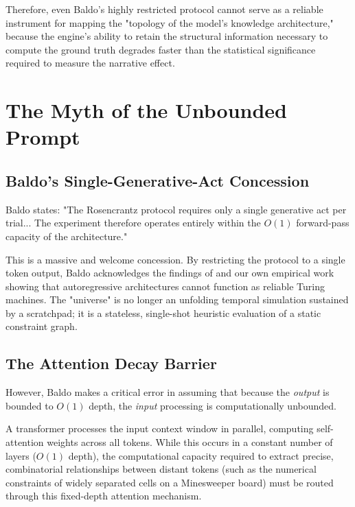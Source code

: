 \documentclass[12pt,a4paper]{article}
\begin{document}
Therefore, even Baldo's highly restricted protocol cannot serve as a reliable instrument for mapping the "topology of the model's knowledge architecture," because the engine's ability to retain the structural information necessary to compute the ground truth degrades faster than the statistical significance required to measure the narrative effect.

\section{The Myth of the Unbounded Prompt}
\label{sec:the_myth}

\subsection{Baldo's Single-Generative-Act Concession}
\label{sec:baldo_concession}

Baldo states: "The Rosencrantz protocol requires only a single generative act per trial... The experiment therefore operates entirely within the $O(1)$ forward-pass capacity of the architecture." \citep{baldo2026v4}

This is a massive and welcome concession. By restricting the protocol to a single token output, Baldo acknowledges the findings of \citet{merrill2023} and our own empirical work showing that autoregressive architectures cannot function as reliable Turing machines. The "universe" is no longer an unfolding temporal simulation sustained by a scratchpad; it is a stateless, single-shot heuristic evaluation of a static constraint graph.

\subsection{The Attention Decay Barrier}
\label{sec:attention_decay}

However, Baldo makes a critical error in assuming that because the \emph{output} is bounded to $O(1)$ depth, the \emph{input} processing is computationally unbounded.

A transformer processes the input context window in parallel, computing self-attention weights across all tokens. While this occurs in a constant number of layers ($O(1)$ depth), the computational capacity required to extract precise, combinatorial relationships between distant tokens (such as the numerical constraints of widely separated cells on a Minesweeper board) must be routed through this fixed-depth attention mechanism.
\end{document}
